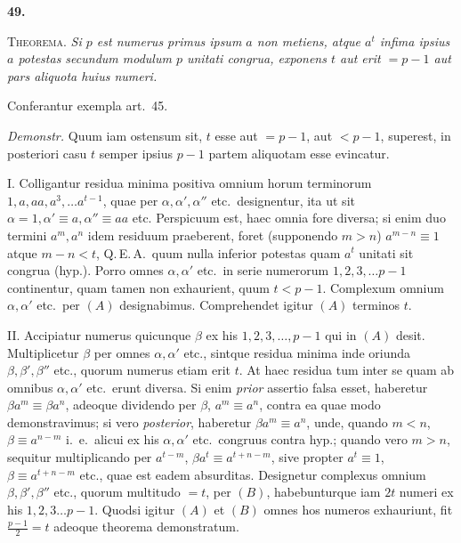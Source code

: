 \documentclass[12pt,a4paper]{article}
\begin{document}
\medskip

\noindent\textbf{49.}

\medskip

\textsc{Theorema.} \textit{Si $p$ est numerus primus ipsum $a$ non metiens, atque
$a^{t}$ infima ipsius $a$ potestas secundum modulum $p$ unitati congrua, exponens $t$
aut erit $= p - 1$ aut pars aliquota huius numeri.}

\medskip

Conferantur exempla art.~45.

\medskip

\textit{Demonstr.} Quum iam ostensum sit, $t$ esse aut $= p - 1$, aut $< p - 1$,
superest, in posteriori casu $t$ semper ipsius $p - 1$ partem aliquotam esse
evincatur.

\medskip

\textsc{I.} Colligantur residua minima positiva omnium horum terminorum $1, a, aa,
a^{3}, \ldots a^{t-1}$, quae per $\alpha, \alpha', \alpha''$ etc.\ designentur, ita
ut sit $\alpha = 1, \alpha' \equiv a, \alpha'' \equiv aa$ etc. Perspicuum est, haec
omnia fore diversa; si enim duo termini $a^{m}, a^{n}$ idem residuum praeberent,
foret (supponendo $m > n$) $a^{m-n} \equiv 1$ atque $m - n < t$, Q.\,E.\,A.\ quum
nulla inferior potestas quam $a^{t}$ unitati sit congrua (hyp.). Porro omnes
$\alpha, \alpha'$ etc.\ in serie numerorum $1, 2, 3, \ldots p - 1$ continentur, quam
tamen non exhaurient, quum $t < p - 1$. Complexum omnium $\alpha, \alpha'$ etc.\ per
$(A)$ designabimus. Comprehendet igitur $(A)$ terminos $t$.

\medskip

\textsc{II.} Accipiatur numerus quicunque $\beta$ ex his $1, 2, 3, \ldots, p - 1$ qui
in $(A)$ desit. Multiplicetur $\beta$ per omnes $\alpha, \alpha'$ etc., sintque
residua minima inde oriunda $\beta, \beta', \beta''$ etc., quorum numerus etiam erit
$t$. At haec residua tum inter se quam ab omnibus $\alpha, \alpha'$ etc.\ erunt
diversa. Si enim \textit{prior} assertio falsa esset, haberetur $\beta a^{m} \equiv
\beta a^{n}$, adeoque dividendo per $\beta$, $a^{m} \equiv a^{n}$, contra ea quae
modo demonstravimus; si vero \textit{posterior}, haberetur $\beta a^{m} \equiv
a^{n}$, unde, quando $m < n$, $\beta \equiv a^{n-m}$ i.~e.\ alicui ex his
$\alpha, \alpha'$ etc.\ congruus contra hyp.; quando vero $m > n$, sequitur
multiplicando per $a^{t-m}$, $\beta a^{t} \equiv a^{t+n-m}$, sive propter $a^{t}
\equiv 1$, $\beta \equiv a^{t+n-m}$ etc., quae est eadem absurditas. Designetur
complexus omnium $\beta, \beta', \beta''$ etc., quorum multitudo $= t$, per $(B)$,
habebunturque iam $2t$ numeri ex his $1, 2, 3 \ldots p - 1$. Quodsi igitur $(A)$ et
$(B)$ omnes hos numeros exhauriunt, fit $\tfrac{p - 1}{2} = t$ adeoque theorema
demonstratum.
\end{document}
